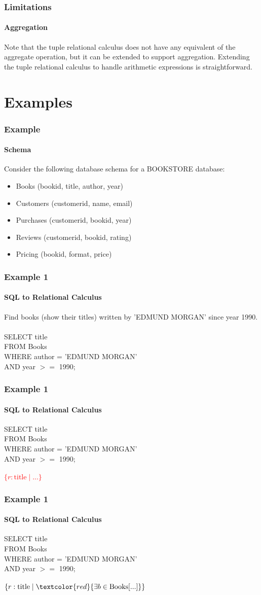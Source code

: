 \documentclass{beamer}
\begin{document}
\begin{frame}
  \frametitle{Limitations}
  \framesubtitle{Aggregation}
  Note that the tuple relational calculus does not have any equivalent of the aggregate operation, but it can be extended to support aggregation. Extending the tuple relational calculus to handle arithmetic expressions is straightforward.
\end{frame}

\section{Examples}
\begin{frame}
  \frametitle{Example}
    \framesubtitle{Schema}
Consider the following database schema for a BOOKSTORE database:
\begin{itemize}
\item Books (bookid, title, author, year)
\item Customers (customerid, name, email)
\item Purchases (customerid, bookid, year)
\item Reviews (customerid, bookid, rating)
\item Pricing (bookid, format, price)
\end{itemize}
\end{frame}
\begin{frame}
  \frametitle{Example 1}
    \framesubtitle{SQL to Relational Calculus}
  Find books (show their titles) written by 'EDMUND MORGAN' since year 1990.\\
  \hfill \\  
  SELECT title\\
  FROM Books\\
  WHERE author = 'EDMUND MORGAN'\\
  AND year $>=$ 1990;\\
\end{frame}

\begin{frame}
  \frametitle{Example 1}
    \framesubtitle{SQL to Relational Calculus}
  SELECT title\\
  FROM Books\\
  WHERE author = 'EDMUND MORGAN'\\
  AND year $>=$ 1990;\\
  \hfill \\
  \textcolor{red}{$\{r:\text{title} \mid ... \}$}
\end{frame}

\begin{frame}
  \frametitle{Example 1}
    \framesubtitle{SQL to Relational Calculus}
  SELECT title\\
  FROM Books\\
  WHERE author = 'EDMUND MORGAN'\\
  AND year $>=$ 1990;\\
  \hfill \\
  $\{r:\text{title} \mid \textcolor{red}{\exists b \in \text{Books} [ ... ]} \}$
\end{frame}
\end{document}
